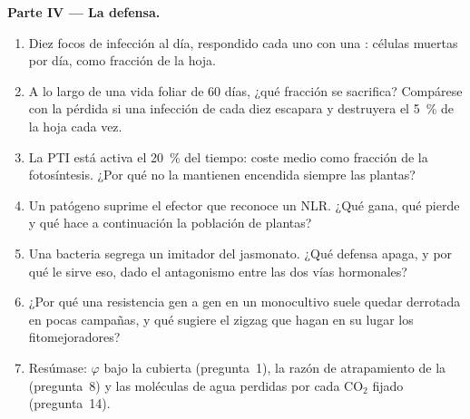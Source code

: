 \begin{problem}
\medskip
\noindent\textbf{Parte IV --- La defensa.}
\begin{enumerate}[resume]
  \item Diez focos de infección al día, respondido cada uno con una
        : células muertas por día, como fracción
        de la hoja.
  \item A lo largo de una vida foliar de 60 días, ¿qué fracción se
        sacrifica? Compárese con la pérdida si una infección de cada
        diez escapara y destruyera el \qty{5}{\%} de la hoja cada vez.
  \item La PTI está activa el \qty{20}{\%} del tiempo: coste medio como
        fracción de la fotosíntesis. ¿Por qué no la mantienen encendida
        siempre las plantas?
  \item Un patógeno suprime el efector que reconoce un NLR. ¿Qué gana,
        qué pierde y qué hace a continuación la población de plantas?
  \item Una bacteria segrega un imitador del jasmonato. ¿Qué defensa
        apaga, y por qué le sirve eso, dado el antagonismo entre las dos
        vías hormonales?
  \item ¿Por qué una resistencia gen a gen en un monocultivo suele
        quedar derrotada en pocas campañas, y qué sugiere el zigzag que
        hagan en su lugar los fitomejoradores?
  \item Resúmase: $\varphi$ bajo la cubierta (pregunta~1), la razón de
        atrapamiento de la  (pregunta~8) y las moléculas de agua
        perdidas por cada CO$_{2}$ fijado (pregunta~14).
\end{enumerate}
\end{problem}
